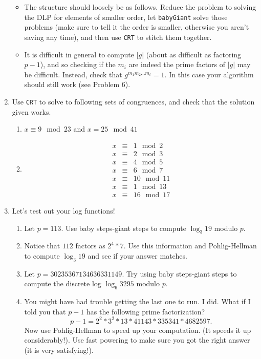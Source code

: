 \documentclass[11pt]{article}
\begin{document}
\begin{enumerate}
{\begin{itemize}
    \item{
    The structure should loosely be as follows.  Reduce the problem to solving the DLP for elements of smaller order, let \verb|babyGiant| solve those problems (make sure to tell it the order is smaller, otherwise you aren't saving any time), and then use \verb|CRT| to stitch them together.
    }
    \item{
    It is difficult in general to compute $|g|$ (about as difficult as factoring $p-1$), and so checking if the $m_i$ are indeed the prime factors of $|g|$ may be difficult.  Instead, check that $g^{m_1m_2...m_t} = 1$.  In this case your algorithm should still work (see Problem 6).
    }
  \end{itemize}
  }
  \item{
  Use \verb|CRT| to solve to following sets of congruences, and check that the solution given works.
  \begin{enumerate}
    \item{
      $x \equiv 9\mod 23$ and $x = 25\mod 41$
    }
    \item{
    \begin{eqnarray*}
      x&\equiv& 1\mod2\\
      x&\equiv& 2\mod3\\
      x&\equiv& 4\mod5\\
      x&\equiv& 6\mod7\\
      x&\equiv& 10\mod 11\\
      x&\equiv& 1\mod 13\\
      x&\equiv& 16\mod 17
    \end{eqnarray*}
    }
  \end{enumerate}
  }
  \item{
  Let's test out your log functions!
  \begin{enumerate}
    \item{
    Let $p = 113$.  Use baby steps-giant steps to compute $\log_3 19$ modulo $p$.
    }
    \item{
    Notice that $112$ factors as $2^4*7$.  Use this information and Pohlig-Hellman to compute $\log_3 19$ and see if your answer matches.
    }
    \item{
    Let $p = 30235367134636331149$.  Try using baby steps-giant steps to compute the discrete log $\log_6 3295$ modulo $p$.
    }
    \item{
    You might have had trouble getting the last one to run.  I did.  What if I told you that $p-1$ has the following prime factorization?
    \[p-1 = 2^2 * 3^2 * 13 * 41143 * 335341 * 4682597.\]
    Now use Pohlig-Hellman to speed up your computation.  (It speeds it up considerably!).  Use fast powering to make sure you got the right answer (it is very satisfying!).
    }
  \end{enumerate}
  }
\end{enumerate}
\end{document}
